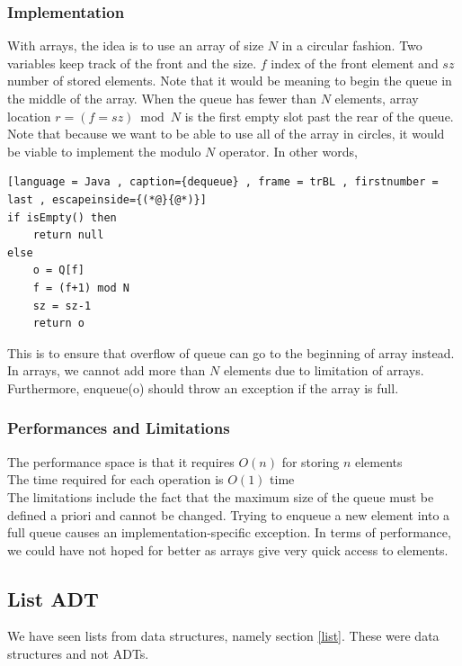 \documentclass[a4paper]{article}
\theoremstyle{plain}
\theoremstyle{definition}
\theoremstyle{remark}
\begin{document}
\subsubsection{Implementation}
With arrays, the idea is to use an array of size $N$ in a circular fashion. Two variables keep track of the front and the size. $f$ index of the front element and $sz$ number of stored elements. Note that it would be meaning to begin the queue in the middle of the array. When the queue has fewer than $N$ elements, array location $r= (f=sz) \bmod N $ is the first empty slot past the rear of the queue. Note that because we want to be able to use all of the array in circles, it would be viable to implement the modulo $N$ operator. In other words,
\begin{lstlisting}[language = Java , caption={dequeue} , frame = trBL , firstnumber = last , escapeinside={(*@}{@*)}]
if isEmpty() then
	return null
else
	o = Q[f]
	f = (f+1) mod N
	sz = sz-1
	return o
\end{lstlisting}
This is to ensure that overflow of queue can go to the beginning of array instead. In arrays, we cannot add more than $N$ elements due to limitation of arrays. Furthermore, enqueue(o) should throw an exception if the array is full.
\subsubsection{Performances and Limitations}
The performance space is that it requires $O(n)$ for storing $n$ elements \\
The time required for each operation is $O(1)$ time \\
The limitations include the fact that the maximum size of the queue must be defined a priori and cannot be changed. Trying to enqueue a new element into a full queue causes an implementation-specific exception. In terms of performance, we could have not hoped for better as arrays give very quick access to elements.
\subsection{List ADT}
We have seen lists from data structures, namely section \ref{list}. These were data structures and not ADTs. 
\end{document}
